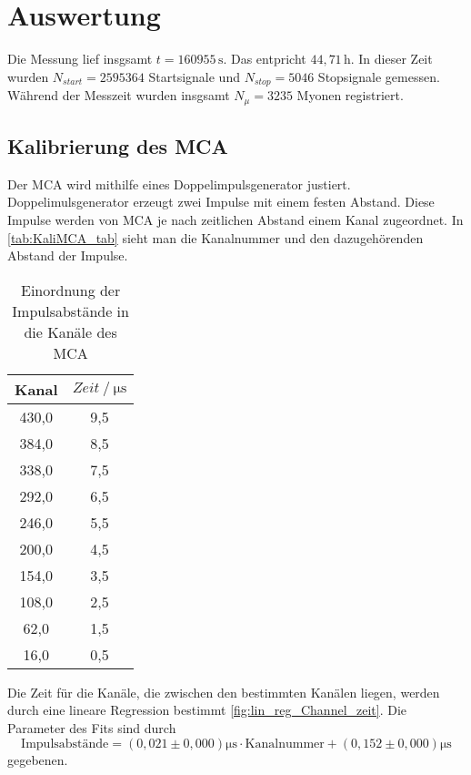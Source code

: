 \section{Auswertung}
\label{sec:auswertung}


Die Messung lief insgsamt $t = 160955 \, \unit{\second}$. Das entpricht $44,71 \, \unit{\hour}$. In dieser Zeit wurden $N_{start} = 2595364$ Startsignale und $N_{stop} = 5046$ Stopsignale gemessen.
Während der Messzeit wurden insgsamt $N_{\mu} = 3235 $ Myonen registriert.

\subsection{Kalibrierung des MCA}
\label{sec:KaliMCA}

Der MCA wird mithilfe eines Doppelimpulsgenerator justiert. Doppelimulsgenerator erzeugt zwei Impulse mit einem festen Abstand.
Diese Impulse werden von MCA je nach zeitlichen Abstand einem Kanal zugeordnet. In \autoref{tab:KaliMCA_tab} sieht man die Kanalnummer und den dazugehörenden Abstand der Impulse.

\begin{table}
    \centering
    \caption{Einordnung der Impulsabstände in die Kanäle des MCA}
    \label{tab:KaliMCA_tab}
    \begin{tabular}{c c}
    \toprule
     Kanal &  $Zeit \mathbin{/} \unit{\micro\second}$ \\
    \midrule
     430,0 &                             9,5 \\
     384,0 &                             8,5 \\
     338,0 &                             7,5 \\
     292,0 &                             6,5 \\
     246,0 &                             5,5 \\
     200,0 &                             4,5 \\
     154,0 &                             3,5 \\
     108,0 &                             2,5 \\
      62,0 &                             1,5 \\
      16,0 &                             0,5 \\
    \bottomrule
    \end{tabular}
    \end{table}

Die Zeit für die Kanäle, die zwischen den bestimmten Kanälen liegen, werden durch eine lineare Regression bestimmt \autoref{fig:lin_reg_Channel_zeit}.
Die Parameter des Fits sind durch 
\begin{equation*}
    \text{Impulsabstände} = \left(0,021 \pm 0,000 \right) \unit{\micro\second} \cdot  \text{Kanalnummer} + \left(0,152 \pm 0,000 \right) \unit{\micro\second}
    \label{eq:Kanal_Zeit_Rechnung}
\end{equation*}
gegebenen.

